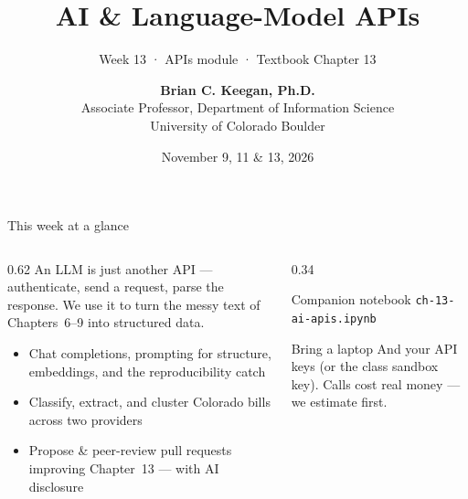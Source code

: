 \documentclass[9pt,aspectratio=169]{beamer}
\title[Week 13 · AI APIs]{{\Huge AI \& Language-Model APIs}}
\subtitle{Week 13 · APIs module · Textbook Chapter 13}
\author[Keegan]{\textbf{Brian C. Keegan, Ph.D.} \\ Associate Professor, Department of Information Science \\ University of Colorado Boulder}
\date{November 9, 11 \& 13, 2026}
\begin{document}
\maketitle

\begin{frame}{This week at a glance}
    \begin{columns}[T]
        \begin{column}{0.62\textwidth}
            An LLM is just another API --- authenticate, send a request, parse the response. We use it to turn the messy text of Chapters~6--9 into structured data.

            \vspace{1em}

            \begin{itemize}\small
                \item Chat completions, prompting for structure, embeddings, and the reproducibility catch
            \end{itemize}

            \vspace{0.5em}

            \begin{itemize}\small
                \item Classify, extract, and cluster Colorado bills across two providers
            \end{itemize}

            \vspace{0.5em}

            \begin{itemize}\small
                \item Propose \& peer-review pull requests improving Chapter~13 --- with AI disclosure
            \end{itemize}
        \end{column}
        \begin{column}{0.34\textwidth}
            \begin{block}{Companion notebook}
                \footnotesize \texttt{ch-13-ai-apis.ipynb}
            \end{block}
            \begin{alertblock}{Bring a laptop}
                \footnotesize And your API keys (or the class sandbox key). Calls cost real money --- we estimate first.
            \end{alertblock}
        \end{column}
    \end{columns}
\end{frame}
\end{document}
